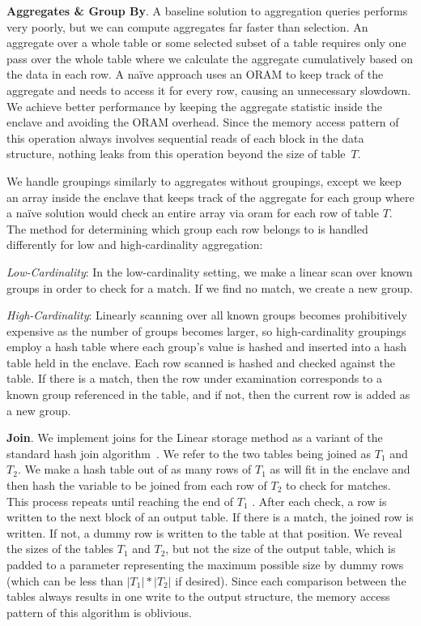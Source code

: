\documentclass[letterpaper,twocolumn,10pt]{article}
\begin{document}
  \noindent \textbf{Aggregates \& Group By}.
A baseline solution to aggregation queries performs very poorly, but we can compute aggregates far faster than selection.  An aggregate over a whole table or some selected subset of a table requires only one pass over the whole table where we calculate the aggregate cumulatively based on the data in each row. A na\"ive approach uses an ORAM to keep track of the aggregate and needs to access it for every row, causing an unnecessary slowdown. We achieve better performance by keeping the aggregate statistic inside the enclave and avoiding the ORAM overhead. Since the memory access pattern of this operation always involves sequential reads of each block in the data structure, nothing leaks from this operation beyond the size of table~$T$.

We handle groupings similarly to aggregates without groupings, except we keep an array inside the enclave that keeps track of the aggregate for each group where a na\"ive solution would check an entire array via oram for each row of table $T$. The method for determining which group each row belongs to is handled differently for low and high-cardinality aggregation:

\textit{Low-Cardinality}: In the low-cardinality setting, we make a linear scan over known groups in order to check for a match. If we find no match, we create a new group.

\textit{High-Cardinality}: Linearly scanning over all known groups becomes prohibitively expensive as the number of groups becomes larger, so high-cardinality groupings employ a hash table where each group's value is hashed and inserted into a hash table held in the enclave. Each row scanned is hashed and checked against the table. If there is a match, then the row under examination corresponds to a known group referenced in the table, and if not, then the current row is added as a new group.


  \noindent \textbf{Join}.
We implement joins for the Linear storage method as a variant of the standard hash join algorithm~\cite{EN10}. We refer to the two tables being joined as $T_1$ and $T_2$. We make a hash table out of as many rows of $T_1$ as will fit in the enclave and then hash the variable to be joined from each row of $T_2$ to check for matches. This process repeats until reaching the end of $T_1$ . After each check, a row is written to the next block of an output table. If there is a match, the joined row is written. If not, a dummy row is written to the table at that position. We reveal the sizes of the tables $T_1$ and $T_2$, but not the size of the output table, which is padded to a parameter representing the maximum possible size by dummy rows (which can be less than $|T_1|*|T_2|$ if desired). Since each comparison between the tables always results in one write to the output structure, the memory access pattern of this algorithm is oblivious.
\end{document}
